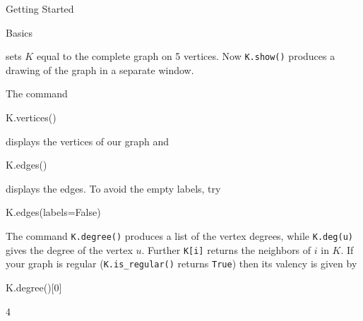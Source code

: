 \begin{chap}{Getting Started}
\begin{sect}{Basics}
\begin{para}
sets $K$ equal to the complete graph on 5 vertices.  
Now \verb|K.show()| produces a drawing of the graph in a separate window. 
\end{para}
%
\begin{para}
The command
\end{para}
%
\begin{sagecode}
\begin{sageinput}
K.vertices()
\end{sageinput}
\begin{sageoutput}
[0, 1, 2, 3, 4]
\end{sageoutput}
\end{sagecode}
%
\begin{para}
displays the vertices of our graph and
\end{para}
%
\begin{sagecode}
\begin{sageinput}
K.edges()
\end{sageinput}
\begin{sageoutput}
\end{sageoutput}
\end{sagecode}
%
\begin{para}
displays the edges. To avoid the empty labels, try
\end{para}
%
\begin{sagecode}
\begin{sageinput}
K.edges(labels=False)
\end{sageinput}
\begin{sageoutput}
[(0, 1), (0, 2), (0, 3), (0, 4), (1, 2), 
(1, 3), (1, 4), (2, 3), (2, 4), (3, 4)]
\end{sageoutput}
\end{sagecode}
%
\begin{para}
The command \verb|K.degree()| produces a list of the vertex degrees,
while \verb|K.deg(u)| gives the degree of the vertex $u$. Further 
\verb|K[i]| returns the neighbors of $i$ in $K$. If your graph is
regular (\verb|K.is_regular()| returns \verb|True|) then its valency
is given by
\end{para}
%
\begin{sagecode}
\begin{sageinput}
K.degree()[0]
\end{sageinput}
\begin{sageoutput}
4
\end{sageoutput}

\end{sagecode}
\end{sect}
\end{chap}
